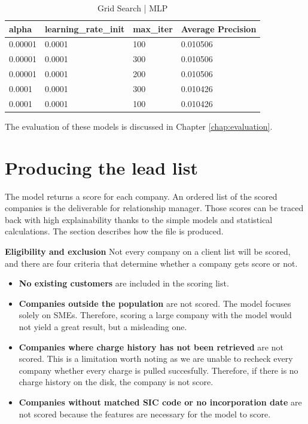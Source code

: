 \documentclass[ %
                    author={Natchalin Iwsakul \\[0.4em] Inkaphol Siriwongwattana \\[0.4em] Tanaphan Kummaraphat \\[0.6em] Patorn Srisupap},,
                supervisor={Fernando Moreno-Pino},
                    degree={MSc},
                     title={Propensity Modelling for SME Commercial Lending Using Open Public Data
},
                  subtitle={Companies House and GDELT as predictors of first-time borrowing},
                      type={},
                      year={2026}]{dissertation}
\begin{document}
  \begin{table}[h]
      \centering
      \begin{tabular}{llll}
      \toprule
          alpha & learning\_rate\_init & max\_iter & Average Precision \\
      \midrule
          0.00001 & 0.0001 & 100 & 0.010506 \\
          0.00001 & 0.0001 & 300 & 0.010506 \\
          0.00001 & 0.0001 & 200 & 0.010506 \\
          0.0001 & 0.0001 & 300 & 0.010426 \\
          0.0001 & 0.0001 & 100 & 0.010426 \\
      \bottomrule
      \end{tabular}
      \caption{Grid Search | MLP}
      \label{gridsearchmlp}
  \end{table}

  The evaluation of these models is discussed in Chapter \ref{chap:evaluation}.



  

\section{Producing the lead list}              \label{sec:leadlist}
The model returns a score for each company. An ordered list of the scored companies is the deliverable for relationship manager. Those scores can be traced back with high explainability thanks to the simple models and statistical calculations. The section describes how the file is produced.

\textbf{Eligibility and exclusion}
Not every company on a client list will be scored, and there are four criteria that determine whether a company gets score or not.

\begin{itemize}
    \item \textbf{No existing customers} are included in the scoring list. 
    \item \textbf{Companies outside the population} are not scored. The model focuses solely on SMEs. Therefore, scoring a large company with the model would not yield a great result, but a misleading one.
    \item \textbf{Companies where charge history has not been retrieved} are not scored. This is a limitation worth noting as we are unable to recheck every company whether every charge is pulled succesfully. Therefore, if there is no charge history on the disk, the company is not score.
    \item \textbf{Companies without matched SIC code or no incorporation date} are not scored because the features are necessary for the model to score.
\end{itemize}
\end{document}
